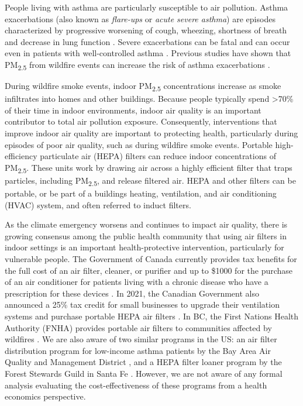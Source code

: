 \documentclass[
  number]{elsarticle}
\begin{document}
People living with asthma are particularly susceptible to air pollution.
Asthma exacerbations (also known as \emph{flare-ups} or \emph{acute
severe asthma}) are episodes characterized by progressive worsening of
cough, wheezing, shortness of breath and decrease in lung function
\citep{globalinitiativeforasthma2022}. Severe exacerbations can be fatal
and can occur even in patients with well-controlled asthma
\citep{globalinitiativeforasthma2022}. Previous studies have shown that
PM\textsubscript{2.5} from wildfire events can increase the risk of
asthma exacerbations \citep{borchers_arriagada_association_2019}.

During wildfire smoke events, indoor PM\textsubscript{2.5}
concentrations increase as smoke infiltrates into homes and other
buildings. Because people typically spend \textgreater70\% of their time
in indoor environments, \citep{statisticscanadageneralsocialsurvey}
indoor air quality is an important contributor to total air pollution
exposure. Consequently, interventions that improve indoor air quality
are important to protecting health, particularly during episodes of poor
air quality, such as during wildfire smoke events. Portable
high-efficiency particulate air (HEPA) filters can reduce indoor
concentrations of PM\textsubscript{2.5}\citep{zhu2021}. These units work
by drawing air across a highly efficient filter that traps particles,
including PM\textsubscript{2.5}, and release filtered air. HEPA and
other filters can be portable, or be part of a buildings heating,
ventilation, and air conditioning (HVAC) system, and often referred to
induct filters.

As the climate emergency worsens and continues to impact air
quality\citep{kirchmeier-young2019}, there is growing consensus among
the public health community that using air filters in indoor settings is
an important health-protective intervention, particularly for vulnerable
people. The Government of Canada currently provides tax benefits for the
full cost of an air filter, cleaner, or purifier and up to \$1000 for
the purchase of an air conditioner for patients living with a chronic
disease who have a prescription for these devices
\citep{canadarevenueagency2016}. In 2021, the Canadian Government also
announced a 25\% tax credit for small businesses to upgrade their
ventilation systems and purchase portable HEPA air filters
\citep{departmentoffinancegovernmentofcanada2021}. In BC, the First
Nations Health Authority (FNHA) provides portable air filters to
communities affected by wildfires
\citep{firstnationshealthauthority2022}. We are also aware of two
similar programs in the US: an air filter distribution program for
low-income asthma patients by the Bay Area Air Quality and Management
District \citep{thebayareaairqualityandmanagementdistrict2021}, and a
HEPA filter loaner program by the Forest Stewards Guild in Santa Fe
\citep{participant2020}. However, we are not aware of any formal
analysis evaluating the cost-effectiveness of these programs from a
health economics perspective.
\end{document}
